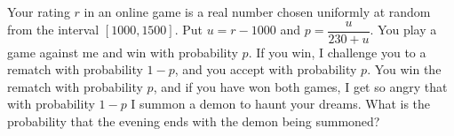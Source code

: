 Your rating $r$ in an online game is a real number chosen uniformly at random from the interval $[1000,1500]$. Put $u=r-1000$ and $p=\dfrac{u}{230+u}$. You play a game against me and win with probability $p$. If you win, I challenge you to a rematch with probability $1-p$, and you accept with probability $p$. You win the rematch with probability $p$, and if you have won both games, I get so angry that with probability $1-p$ I summon a demon to haunt your dreams. What is the probability that the evening ends with the demon being summoned?
